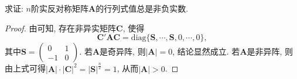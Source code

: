\documentclass[../../main.tex]{subfiles}
\begin{document}
\begin{proposition}\label{proposition:实反称矩阵的行列式必非负}
求证: $n$阶实反对称矩阵$\boldsymbol{A}$的行列式值总是非负实数.
\end{proposition}
\begin{proof}
由可知, 存在非异实矩阵$\boldsymbol{C}$, 使得
\[
\boldsymbol{C}'\boldsymbol{A}\boldsymbol{C}=\text{diag}\{\boldsymbol{S}, \cdots, \boldsymbol{S}, 0, \cdots, 0\},
\]
其中$\boldsymbol{S}=\begin{pmatrix}
0 & 1 \\
-1 & 0
\end{pmatrix}$. 若$\boldsymbol{A}$是奇异阵, 则$|\boldsymbol{A}| = 0$, 结论显然成立. 若$\boldsymbol{A}$是非异阵, 则由上式可得$|\boldsymbol{A}|\cdot|\boldsymbol{C}|^2 = |\boldsymbol{S}|^{\frac{n}{2}} = 1$, 从而$|\boldsymbol{A}|>0$. 

\end{proof}
\end{document}
